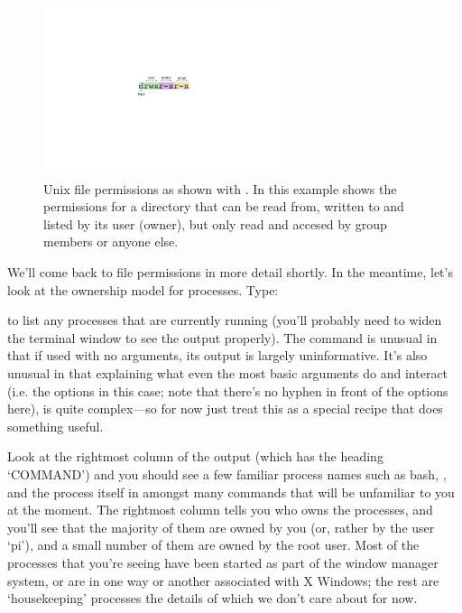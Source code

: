 \begin{figure}
\centerline{\includegraphics[width=7cm]{images/filepermissions}}
\caption{Unix file permissions as shown with . In this example shows the permissions for a directory that can be read from, written to and listed by its user (owner), but only read and accesed by group members or anyone else.}\label{figure:fileperms}
\end{figure}

We'll come back to file permissions in more detail shortly. In the meantime, let's look at the ownership model for processes. Type:


to list any processes that are currently running (you'll probably need to widen the terminal window to see the output properly). The  command is unusual in that if used with no arguments, its output is largely uninformative. It's also unusual in that explaining what even the most basic arguments do and interact (i.e. the  options in this case; note that there's no hyphen in front of the options here), is quite complex---so for now just treat this as a special recipe that does something useful. 

Look at the rightmost column of the output (which has the heading `COMMAND') and you should see a few familiar process names such as bash, , and the  process itself in amongst many commands that will be unfamiliar to you at the moment. The rightmost column tells you who owns the processes, and you'll see that the majority of them are owned by you (or, rather by the user `pi'), and a small number of them are owned by the root user. Most of the processes that you're seeing have been started as part of the window manager system, or are in one way or another associated with X Windows; the rest are `housekeeping' processes the details of which we don't care about for now. 


